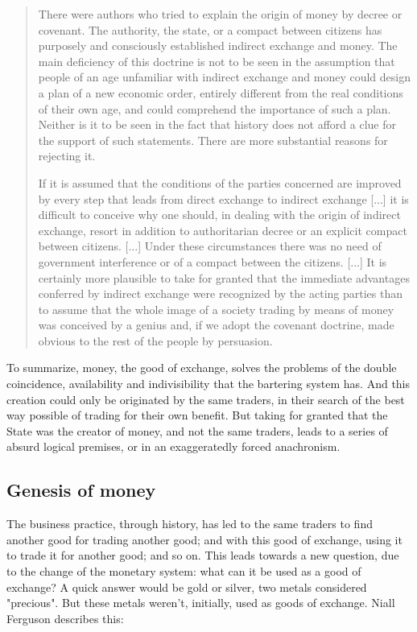\documentclass[12pt,a4paper,twoside]{book}
\begin{document}
\begin{quotation}
There were authors who tried to explain the origin of money by decree or covenant. The authority, the state, or a compact between citizens has purposely and consciously established indirect exchange and money. The main deficiency of this doctrine is not to be seen in the assumption that people of an age unfamiliar with indirect exchange and money could design a plan of a new economic order, entirely different from the real conditions of their own age, and could comprehend the importance of such a plan. Neither is it to be seen in the fact that history does not afford a clue for the support of such statements. There are more substantial reasons for rejecting it.

If it is assumed that the conditions of the parties concerned are improved by every step that leads from direct exchange to indirect exchange [...] it is difficult to conceive why one should, in dealing with the origin of indirect exchange, resort in addition to authoritarian decree or an explicit compact between citizens. [...] Under these circumstances there was no need of government interference or of a compact between the citizens. [...] It is certainly more plausible to take for granted that the immediate advantages conferred by indirect exchange were recognized by the acting parties than to assume that the whole image of a society trading by means of money was conceived by a genius and, if we adopt the covenant doctrine, made obvious to the rest of the people by persuasion. \cite[pp. 402-403]{mises:ha}
\end{quotation}

To summarize, money, the good of exchange, solves the problems of the double coincidence, availability and indivisibility that the bartering system has. And this creation could only be originated by the same traders, in their search of the best way possible of trading for their own benefit. But taking for granted that the State was the creator of money, and not the same traders, leads to a series of absurd logical premises, or in an exaggeratedly forced anachronism.

\subsection{Genesis of money}
The business practice, through history, has led to the same traders to find another good for trading another good; and with this good of exchange, using it to trade it for another good; and so on. This leads towards a new question, due to the change of the monetary system: what can it be used as a good of exchange? A quick answer would be gold or silver, two metals considered "precious". But these metals weren't, initially, used as goods of exchange. Niall Ferguson describes this:
\end{document}
